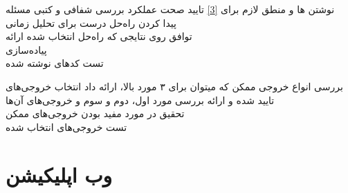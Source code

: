 \begin{wbsbox}{}
\begin{wbssub}
{نوشتن ها و منطق لازم برای \ref{3}}
{تایید صحت عملکرد}
\task 
بررسی شفافی و کتبی مسئله \\
\task
پیدا کردن راه‌حل درست برای تحلیل زمانی \\
\task
توافق روی نتایجی که راه‌حل انتخاب شده ارائه \\
\task
پیاده‌سازی \\
\task
تست کد‌‌های نوشته شده
\end{wbssub}

\begin{wbssub}
{بررسی انواع خروجی ممکن که میتوان برای ۳ مورد بالا، ارائه داد}
{انتخاب خروجی‌های تایید شده و ارائه}
\task
بررسی مورد اول، دوم و سوم و خروجی‌های آن‌ها \\
\task
تحقیق در مورد مفید بودن خروجی‌های ممکن \\
\task
تست خروجی‌های انتخاب شده
\end{wbssub}
\end{wbsbox}

\section{وب اپلیکیشن}